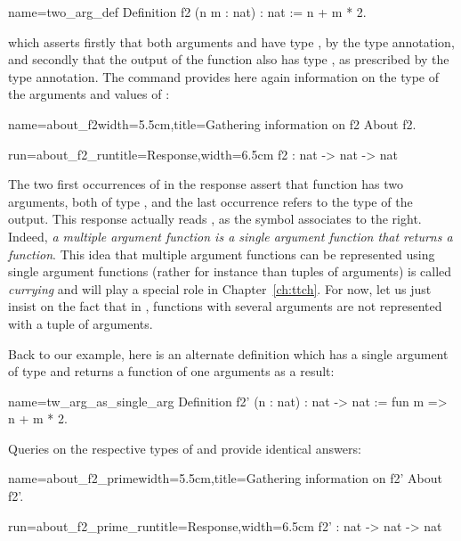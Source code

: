 \begin{coq}{name=two_arg_def}{}
Definition f2 (n m : nat) : nat :=
  n + m * 2.
\end{coq}
which asserts firstly that both arguments  and  have type
, by the  type annotation, and secondly that the
output of the function also has type , as prescribed by the
 type annotation. The   command provides
here again information on the type of the arguments and values of
:
\begin{coq}{name=about_f2}{width=5.5cm,title=Gathering information on f2}
About f2.
\end{coq}
\begin{coqout}{run=about_f2_run}{title=Response,width=6.5cm}
f2 : nat -> nat -> nat
\end{coqout}
The two first occurrences of  in the response
  assert that function  has two arguments,
 both of type , and the last occurrence refers to the type of
 the output. This response actually reads ,
 as the \C{->} symbol associates to the right. Indeed, {\em a multiple
 argument function is a single argument function that returns a
 function}.  This idea that multiple argument functions can be
represented using single argument functions (rather for instance than
tuples of arguments) is called {\em currying} and will play a special
role in Chapter~\ref{ch:ttch}. For now, let us just insist on the fact
that in \Coq{}, functions with several arguments are not represented
with a tuple of arguments.


Back to our example, here is an alternate definition
  which has a single argument  of type  and returns
 a function of one arguments as a result:

\begin{coq}{name=tw_arg_as_single_arg}{}
Definition f2' (n : nat) : nat -> nat := fun m => n + m * 2.
\end{coq}

Queries on the respective types of  and  provide identical answers:
\begin{coq}{name=about_f2_prime}{width=5.5cm,title=Gathering information on f2'}
About f2'.
\end{coq}
\begin{coqout}{run=about_f2_prime_run}{title=Response,width=6.5cm}
f2' : nat -> nat -> nat
\end{coqout}

